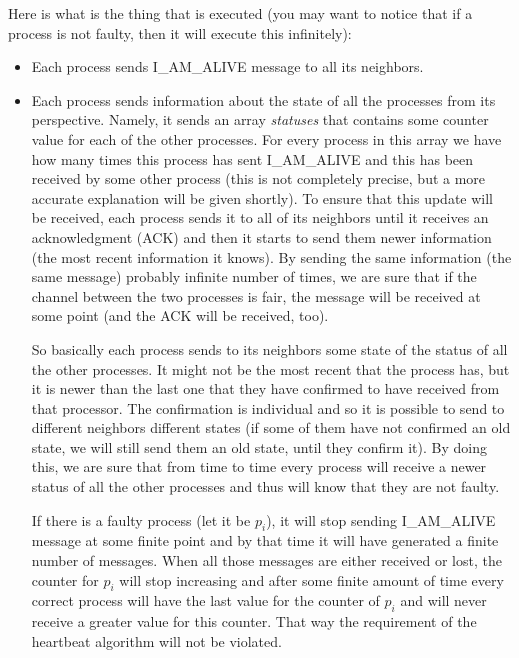 \documentclass[12pt]{article}
\theoremstyle{plain}
\begin{document}
Here is what is the thing that is executed (you may want to notice that if a 
process is not faulty, then it will execute this infinitely):
\begin{itemize}
  \item Each process sends I\_AM\_ALIVE message to all its neighbors.
  \item Each process sends information about the state of all the processes 
    from its perspective. Namely, it sends an array \emph{statuses} that contains
    some counter value for each of the other processes. For every process in
    this array we have how many times this process has sent I\_AM\_ALIVE and
    this has been received by some other process (this is not completely
    precise, but a more accurate explanation will be given shortly). To ensure
    that this update will be received, each process sends it to all of its 
    neighbors until it receives an acknowledgment (ACK) and then it starts to
    send them newer information (the most recent information it knows). By
    sending the same information (the same message) probably infinite number of
    times, we are sure that if the channel between the two processes is fair,
    the message will be received at some point (and the ACK will be received,
    too).

    So basically each process sends to its neighbors some state of the status
    of all the other processes. It might not be the most recent that the process
    has, but it is newer than the last one that they have confirmed to have
    received from that processor. The confirmation is individual and so it is
    possible to send to different neighbors different states (if some of them 
    have not confirmed an old state, we will still send them an old state,
    until they confirm it). By doing this, we are sure that from time to time
    every process will receive a newer status of all the other processes and
    thus will know that they are not faulty. 

    If there is a faulty process (let it be $p_i$), it will stop sending
    I\_AM\_ALIVE message at some finite point and by that time it will have
    generated a finite number of messages. When all those messages are either
    received or lost, the counter for $p_i$ will stop increasing and after 
    some finite amount of time every correct process will have the last value
    for the counter of $p_i$ and will never receive a greater value for this
    counter. That way the requirement of the heartbeat algorithm will not be
    violated.


\end{itemize}
\end{document}
